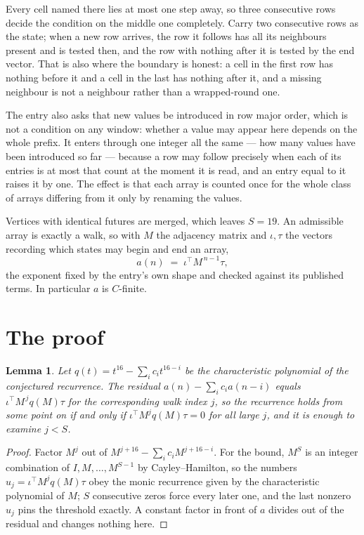 \documentclass[11pt,a4paper]{article}
\theoremstyle{plain}
\newtheorem{lemma}[theorem]{Lemma}
\theoremstyle{definition}
\begin{document}
Every cell named there lies at most one step away, so three consecutive rows decide the condition on the middle one completely. Carry two consecutive rows as the state; when a new row arrives, the row it follows has all its neighbours present and is tested then, and the row with nothing after it is tested by the end vector. That is also where the boundary is honest: a cell in the first row has nothing before it and a cell in the last has nothing after it, and a missing neighbour is not a neighbour rather than a wrapped-round one.

The entry also asks that new values be introduced in row major order, which is not a condition on any window: whether a value may appear here depends on the whole prefix. It enters through one integer all the same --- how many values have been introduced so far --- because a row may follow precisely when each of its entries is at most that count at the moment it is read, and an entry equal to it raises it by one. The effect is that each array is counted once for the whole class of arrays differing from it only by renaming the values.

Vertices with identical futures are merged, which leaves $S=19$. An admissible array is exactly a walk, so with $M$ the adjacency matrix and $\iota,\tau$ the vectors recording which states may begin and end an array,
\[
a(n)\;=\;\iota^{\!\top}M^{\,n-1}\tau ,
\]
the exponent fixed by the entry's own shape and checked against its published terms. In
particular $a$ is $C$-finite.

\section{The proof}

\begin{lemma}\label{lem:crit}
Let $q(t)=t^{16}-\sum_i c_it^{16-i}$ be the characteristic polynomial of the
conjectured recurrence. The residual $a(n)-\sum_ic_ia(n-i)$ equals
$\iota^{\!\top}M^{\,j}q(M)\tau$ for the corresponding walk index $j$, so the recurrence
holds from some point on if and only if $\iota^{\!\top}M^{j}q(M)\tau=0$ for all large $j$,
and it is enough to examine $j<S$.
\end{lemma}

\begin{proof}
Factor $M^{j}$ out of $M^{j+16}-\sum_ic_iM^{j+16-i}$. For the bound, $M^{S}$
is an integer combination of $I,M,\dots,M^{S-1}$ by Cayley--Hamilton, so the numbers
$u_j=\iota^{\!\top}M^{j}q(M)\tau$ obey the monic recurrence given by the characteristic
polynomial of $M$; $S$ consecutive zeros force every later one, and the last nonzero $u_j$
pins the threshold exactly. A constant factor in front of $a$ divides out of the residual and
changes nothing here.
\end{proof}
\end{document}
